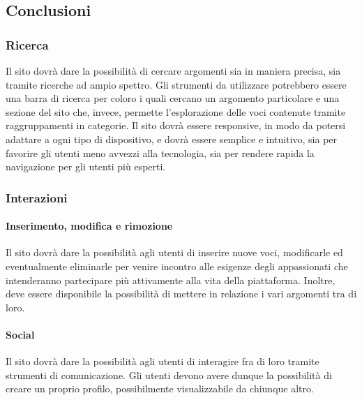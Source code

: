 \subsection{Conclusioni}

\subsubsection{Ricerca}
Il sito dovrà dare la possibilità di cercare argomenti sia in maniera precisa, sia tramite ricerche ad ampio spettro. Gli strumenti da utilizzare potrebbero essere una barra di ricerca per coloro i quali cercano un argomento particolare e una sezione del sito che, invece, permette l'esplorazione delle voci contenute tramite raggruppamenti in categorie. Il sito dovrà essere responsive, in modo da potersi adattare a ogni tipo di dispositivo, e dovrà essere semplice e intuitivo, sia per favorire gli utenti meno avvezzi alla tecnologia, sia per rendere rapida la navigazione per gli utenti più esperti.

\subsubsection{Interazioni}
\paragraph{Inserimento, modifica e rimozione}
Il sito dovrà dare la possibilità agli utenti di inserire nuove voci, modificarle ed eventualmente eliminarle per venire incontro alle esigenze degli appassionati che intenderanno partecipare più attivamente alla vita della piattaforma. Inoltre, deve essere disponibile la possibilità di mettere in relazione i vari argomenti tra di loro.

\paragraph{Social}
Il sito dovrà dare la possibilità agli utenti di interagire fra di loro tramite strumenti di comunicazione. Gli utenti devono avere dunque la possibilità di creare un proprio profilo, possibilmente visualizzabile da chiunque altro.